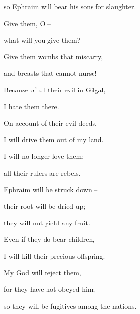 {\par }{\Q so Ephraim
will bear
his sons
for slaughter.
\par }{\Q {}Give
them, O
{} –
\par }{\Q what
will you give
them?
\par }{\Q Give
them
wombs
that miscarry,
\par }{\Q and breasts
that cannot nurse!
\par }{\Q {}Because
of all
their evil
in Gilgal,
\par }{\Q I hate
them there.
\par }{\Q On
account of their evil
deeds,
\par }{\Q I will drive
them out of my land.

\par }{\Q I will no
longer
love
them;
\par }{\Q all
their rulers
are rebels.
\par }{\Q {}Ephraim
will be struck down –
\par }{\Q their root
will be dried
up;
\par }{\Q they will not
yield
any fruit.
\par }{\Q Even if
they do bear children,
\par }{\Q I will kill
their precious
offspring.
\par }{\Q {}My God
will reject
them,
\par }{\Q for
they have not
obeyed
him;
\par }{\Q so they will be
fugitives
among the nations.

\par }

